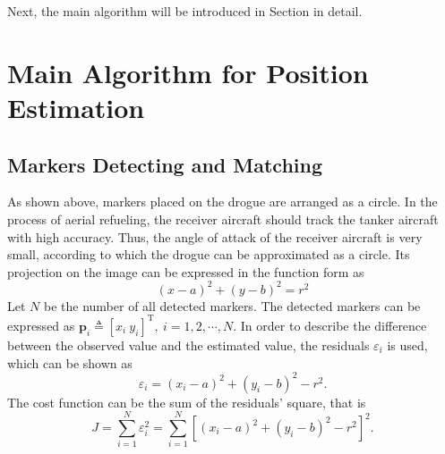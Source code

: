 Next, the main algorithm will be introduced in Section \uppercase\expandafter{} in detail.

\section{Main Algorithm for Position Estimation}
\subsection{Markers Detecting and Matching}
As shown above, markers placed on the drogue are arranged as a circle. In
the process of aerial refueling, the receiver aircraft should track the
tanker aircraft with high accuracy. Thus, the angle of attack of the receiver
aircraft is very small, according to which the drogue can be approximated as
a circle. Its projection on the image can be expressed in the function form
as 
\begin{equation}
\left( x-a\right) ^{2}+(y-b)^{2}=r^{2}  \label{eq1}
\end{equation}
Let $N$ be the number of all detected markers. The detected markers can be expressed as
$\mathbf{p}_{i}\triangleq[x_{i}\ y_{i}]^{\mathrm{T}},\ i=1,2,\cdots,N$.
In order to describe the difference between the observed value and the
estimated value, the residuals $\varepsilon _{i}$ is used, which can be shown
as 
\begin{equation}
\varepsilon _{i}=\left( x_{i}-a\right) ^{2}+(y_{i}-b)^{2}-r^{2}.  \label{eq2}
\end{equation}
The cost function can be the sum of the residuals' square, that is 
\begin{equation}
J=\sum_{i=1}^{N}\varepsilon _{i}^{2}=\sum_{i=1}^{N}\left[ \left(x_{i}-a\right) ^{2}+(y_{i}-b)^{2}-r^{2}\right]^{2}.  \label{eq3}
\end{equation}

